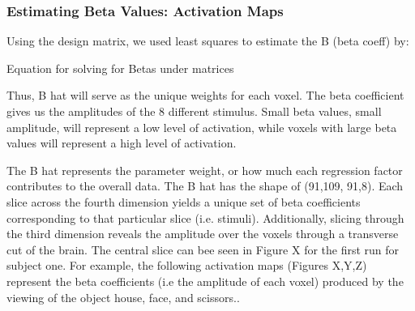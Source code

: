 \documentclass[12pt]{article}
\begin{document}
\subsubsection{Estimating Beta Values: Activation Maps}
Using the design matrix, we used least squares to estimate the B (beta coeff) by:

     Equation for solving for Betas under matrices

Thus, B hat will serve as the unique weights for each voxel. The beta 
coefficient gives us the amplitudes of the 8 different stimulus. Small beta values, small amplitude,
will represent a low level of activation, while voxels with large beta values will
represent a high level of activation.

The B hat represents the parameter weight, or how much each regression factor 
contributes to the overall data. The B hat has the shape of (91,109, 91,8). 
Each slice across the fourth dimension yields a unique set of beta coefficients 
corresponding to that particular slice (i.e. stimuli). Additionally, slicing 
through the third dimension reveals the amplitude over the voxels through a 
transverse cut of the brain. The central slice can bee seen in Figure X for the 
first run for subject one.
For example, the following activation maps (Figures X,Y,Z) represent the beta 
coefficients (i.e the amplitude of each voxel) produced by the viewing of the 
object house, face, and scissors..
\end{document}
